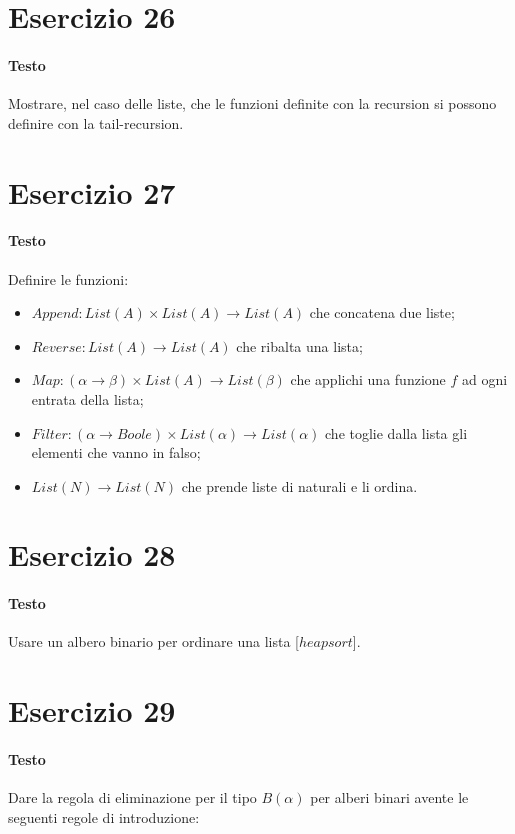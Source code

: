 \documentclass[a4paper,11pt]{article}
\begin{document}
\section*{Esercizio 26}
\paragraph{Testo}
Mostrare, nel caso delle liste, che le funzioni definite con la recursion si possono definire con la tail-recursion.

\section*{Esercizio 27}
\paragraph{Testo}
Definire le funzioni:
\begin{itemize}
\item $Append : List(A) \times List(A) \rightarrow List(A)$ che concatena due liste;
\item $Reverse : List(A) \rightarrow List(A)$ che ribalta una lista;
\item $Map : (\alpha \rightarrow \beta) \times List(A) \rightarrow List(\beta)$ che applichi una funzione $f$ ad ogni entrata della lista;
\item $Filter : (\alpha \rightarrow Boole) \times List(\alpha) \rightarrow List(\alpha)$ che toglie dalla lista gli elementi che vanno in falso;
\item $List(N) \rightarrow List(N)$ che prende liste di naturali e li ordina.
\end{itemize}

\section*{Esercizio 28}
\paragraph{Testo}
Usare un albero binario per ordinare una lista [$heapsort$]. 

\section*{Esercizio 29}
\paragraph{Testo}
Dare la regola di eliminazione per il tipo $B(\alpha)$ per alberi binari avente le seguenti regole di introduzione:
\begin{prooftree}
\end{prooftree}
\end{document}
